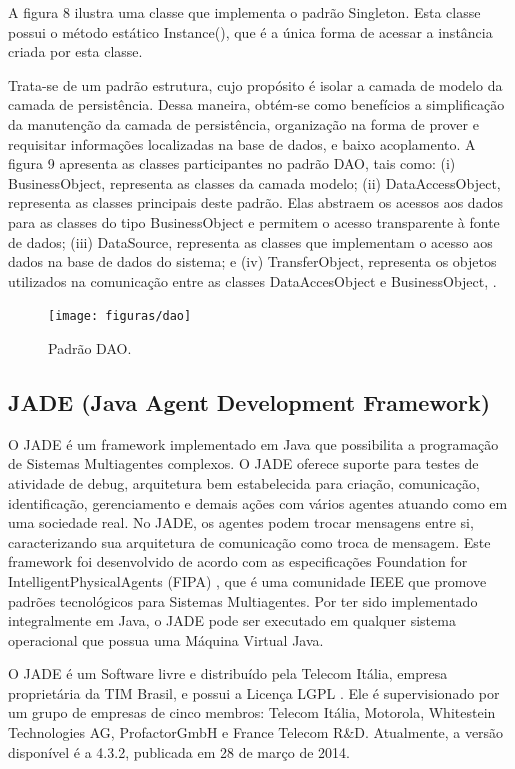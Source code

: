 A figura 8 ilustra uma classe que implementa o padrão Singleton. Esta classe possui o método estático Instance(), que é a única forma de acessar a instância criada por esta classe.



Trata-se de um padrão estrutura, cujo propósito é isolar a camada de modelo da camada de persistência. Dessa maneira, obtém-se como benefícios a simplificação da manutenção da camada de persistência,  organização na forma de prover e requisitar informações localizadas na base de dados, e baixo acoplamento. A figura 9 apresenta as classes participantes no padrão DAO, tais como: (i) BusinessObject, representa as classes da camada modelo; (ii) DataAccessObject, representa as classes principais deste padrão. Elas abstraem os acessos aos dados para as classes do tipo BusinessObject e permitem o acesso transparente à fonte de dados; (iii) DataSource, representa as classes que implementam o acesso aos dados na base de dados do sistema; e (iv) TransferObject, representa os objetos utilizados na comunicação entre as classes DataAccesObject e BusinessObject, \cite{oracle2015}.

\begin{figure}[h!]
\centering
\label{f09}
\texttt{[image: figuras/dao]}
\caption{Padrão DAO.}
\end{figure}


\subsection{JADE (Java Agent Development Framework)}

O JADE \cite{telecon2014} é um framework implementado em Java que possibilita a programação de Sistemas Multiagentes complexos. O JADE oferece suporte para testes de atividade de debug, arquitetura bem estabelecida para criação, comunicação, identificação, gerenciamento e demais ações com vários agentes atuando como em uma sociedade real. No JADE, os agentes podem trocar mensagens entre si, caracterizando sua arquitetura de comunicação como troca de mensagem. Este framework foi desenvolvido de acordo com as especificações Foundation for IntelligentPhysicalAgents (FIPA) \cite{telecon2014}, que é uma comunidade IEEE que promove padrões tecnológicos para Sistemas Multiagentes. Por ter sido implementado integralmente em Java, o JADE pode ser executado em qualquer sistema operacional que possua uma Máquina Virtual Java.

O JADE é um Software livre e distribuído pela Telecom Itália, empresa proprietária da TIM Brasil, e possui a Licença LGPL \cite{telecon2014}. Ele é supervisionado por um grupo de empresas de cinco membros: Telecom Itália, Motorola, Whitestein Technologies AG, ProfactorGmbH e France Telecom R\&D. Atualmente, a versão disponível é a 4.3.2, publicada em 28 de março de 2014.

